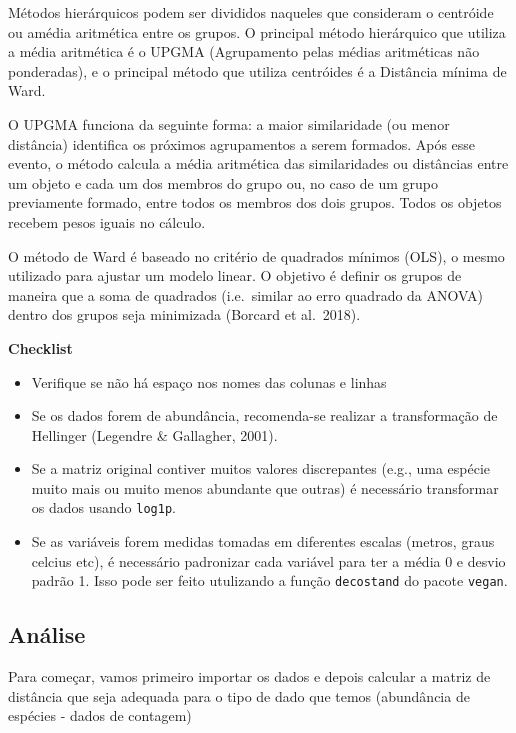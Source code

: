 \documentclass[
]{book}
\providecommand{\tightlist}{%
  \setlength{\itemsep}{0pt}\setlength{\parskip}{0pt}}
\begin{document}
Métodos hierárquicos podem ser divididos naqueles que consideram o centróide ou amédia aritmética entre os grupos. O principal método hierárquico que utiliza a média aritmética é o UPGMA (Agrupamento pelas médias aritméticas não ponderadas), e o principal método que utiliza centróides é a Distância mínima de Ward.

O UPGMA funciona da seguinte forma: a maior similaridade (ou menor distância) identifica os próximos agrupamentos a serem formados. Após esse evento, o método calcula a média aritmética das similaridades ou distâncias entre um objeto e cada um dos membros do grupo ou, no caso de um grupo previamente formado, entre todos os membros dos dois grupos. Todos os objetos recebem pesos iguais no cálculo.

O método de Ward é baseado no critério de quadrados mínimos (OLS), o mesmo utilizado para ajustar um modelo linear. O objetivo é definir os grupos de maneira que a soma de quadrados (i.e.~similar ao erro quadrado da ANOVA) dentro dos grupos seja minimizada (Borcard et al.~2018).

\textbf{Checklist}

\begin{itemize}
\tightlist
\item
  Verifique se não há espaço nos nomes das colunas e linhas
\item
  Se os dados forem de abundância, recomenda-se realizar a transformação de Hellinger (Legendre \& Gallagher, 2001).
\item
  Se a matriz original contiver muitos valores discrepantes (e.g., uma espécie muito mais ou muito menos abundante que outras) é necessário transformar os dados usando \texttt{log1p}.
\item
  Se as variáveis forem medidas tomadas em diferentes escalas (metros, graus celcius etc), é necessário padronizar cada variável para ter a média 0 e desvio padrão 1. Isso pode ser feito utulizando a função \texttt{decostand} do pacote \texttt{vegan}.
\end{itemize}

\hypertarget{anuxe1lise}{%
\subsection{Análise}\label{anuxe1lise}}

Para começar, vamos primeiro importar os dados e depois calcular a matriz de distância que seja adequada para o tipo de dado que temos (abundância de espécies - dados de contagem)
\end{document}
